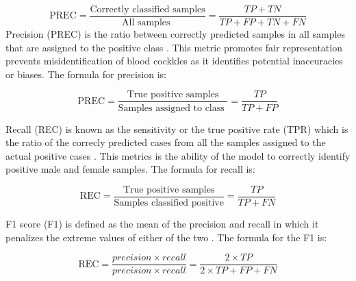 \begin{equation}
	\text{PREC} = \frac{\text{Correctly classified samples}} {\text{All samples }} = \frac{TP+ TN}{TP + FP + TN + FN}
	\label{eq:acc}
\end{equation}
Precision (PREC) is the ratio between correctly predicted samples in all samples that are assigned to the positive class \cite{cui2020}. This metric promotes fair representation prevents misidentification of blood cockkles as it identifies potential inaccuracies or biases. The formula for precision is:


\begin{equation}
	\text{PREC} = \frac{\text{True positive samples}} {\text{Samples assigned to class }} = \frac{TP}{TP + FP}
	\label{eq:prec}
\end{equation}

Recall (REC) is known as the sensitivity or the true positive rate (TPR) which is the ratio of the correcly predicted cases from all the samples assigned to the actual positive cases \cite{cui2020}. This metrics is the ability of the model to correctly identify positive male and female samples. The formula for recall is:

\begin{equation}
	\text{REC} = \frac{\text{True positive samples}} {\text{Samples classified positive}} = \frac{TP}{TP + FN}
	\label{eq:rec}
\end{equation}

F1 score (F1) is defined as the mean of the precision and recall in which it penalizes the extreme values of either of the two \cite{cui2020}. The formula for the F1 is: 

\begin{equation}
	\text{REC} = \frac{ precision \times recall }{precision \times recall }= \frac{2 \times TP}{2 \times TP + FP + FN}
	\label{eq:f1}
\end{equation}
